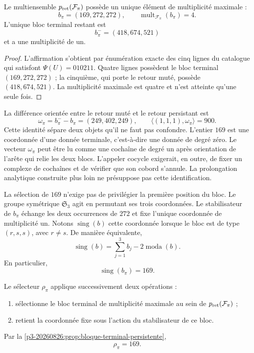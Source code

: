 \begin{proposition}
\label{p3-20260826:prop:bloque-terminal-persistente}
Le multiensemble \(p_{\rm ret}(\mathcal F_\pi)\) possède un unique élément de
multiplicité maximale :
\[
b_\pi=(169,272,272),
\qquad
\operatorname{mult}_{\mathcal F_\pi}(b_\pi)=4.
\]
L'unique bloc terminal restant est
\[
b_\pi^-=(418,674,521)
\]
et a une multiplicité de un.
\end{proposition}

\begin{proof}
L'affirmation s'obtient par énumération exacte des cinq lignes du catalogue qui satisfont \(\Psi(U)=010211\). Quatre lignes possèdent le bloc terminal \((169,272,272)\) ; la cinquième, qui porte le retour muté, possède \((418,674,521)\). La multiplicité maximale est quatre et n'est atteinte qu'une seule fois.
\end{proof}

La différence orientée entre le retour muté et le retour persistant est
\[
 \omega_\pi=b_\pi^- - b_\pi=(249,402,249),
 \qquad
 \langle(1,1,1),\omega_\pi\rangle=900.
\]
Cette identité sépare deux objets qu'il ne faut pas confondre. L'entier
\(169\) est une coordonnée d'une donnée terminale, c'est-à-dire une donnée de degré
zéro. Le vecteur \(\omega_\pi\) peut être lu comme une cochaîne de degré un
après orientation de l'arête qui relie les deux blocs. L'appeler cocycle exigerait,
en outre, de fixer un complexe de cochaînes et de vérifier que son cobord s'annule.
La prolongation analytique construite plus loin ne présuppose pas cette
identification.

La sélection de \(169\) n'exige pas de privilégier la première position du bloc.
Le groupe symétrique \(\mathfrak S_3\) agit en permutant ses trois coordonnées.
Le stabilisateur de \(b_\pi\) échange les deux occurrences de \(272\) et
fixe l'unique coordonnée de multiplicité un. Notons
\(\operatorname{sing}(b)\) cette coordonnée lorsque le bloc est de type
\((r,s,s)\), avec \(r\ne s\). De manière équivalente,
\[
\operatorname{sing}(b)
=\sum_{j=1}^3b_j-2\operatorname{moda}(b).
\]
En particulier,
\[
\boxed{\operatorname{sing}(b_\pi)=169.}
\]

\begin{definition}
\label{p3-20260826:def:selector-residual-pi}
Le sélecteur \(\rho_\pi\) applique successivement deux opérations :
\begin{enumerate}
  \item sélectionne le bloc terminal de multiplicité maximale au sein de \(p_{\rm ret}(\mathcal F_\pi)\) ;
  \item retient la coordonnée fixe sous l'action du stabilisateur de ce bloc.
\end{enumerate}
Par la \cref{p3-20260826:prop:bloque-terminal-persistente},
\[
\boxed{\rho_\pi=169.}
\]
\end{definition}

